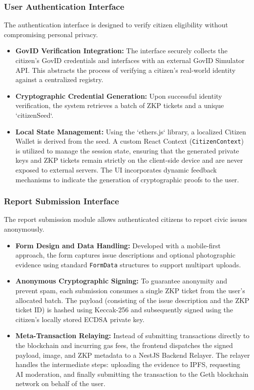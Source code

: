 \subsubsection{User Authentication Interface}
The authentication interface is designed to verify citizen eligibility without compromising personal privacy.
\begin{itemize}
    \item \textbf{GovID Verification Integration:} The interface securely collects the citizen's GovID credentials and interfaces with an external GovID Simulator API. This abstracts the process of verifying a citizen's real-world identity against a centralized registry.
    \item \textbf{Cryptographic Credential Generation:} Upon successful identity verification, the system retrieves a batch of \ac{ZKP} tickets and a unique `citizenSeed`. 
    \item \textbf{Local State Management:} Using the `ethers.js` library, a localized Citizen Wallet is derived from the seed. A custom React Context (\texttt{CitizenContext}) is utilized to manage the session state, ensuring that the generated private keys and ZKP tickets remain strictly on the client-side device and are never exposed to external servers. The UI incorporates dynamic feedback mechanisms to indicate the generation of cryptographic proofs to the user.
\end{itemize}

\subsubsection{Report Submission Interface}
The report submission module allows authenticated citizens to report civic issues anonymously.
\begin{itemize}
    \item \textbf{Form Design and Data Handling:} Developed with a mobile-first approach, the form captures issue descriptions and optional photographic evidence using standard \texttt{FormData} structures to support multipart uploads.
    \item \textbf{Anonymous Cryptographic Signing:} To guarantee anonymity and prevent spam, each submission consumes a single ZKP ticket from the user's allocated batch. The payload (consisting of the issue description and the ZKP ticket ID) is hashed using Keccak-256 and subsequently signed using the citizen's locally stored ECDSA private key.
    \item \textbf{Meta-Transaction Relaying:} Instead of submitting transactions directly to the blockchain and incurring gas fees, the frontend dispatches the signed payload, image, and ZKP metadata to a NestJS Backend Relayer. The relayer handles the intermediate steps: uploading the evidence to IPFS, requesting AI moderation, and finally submitting the transaction to the Geth blockchain network on behalf of the user.
\end{itemize}

